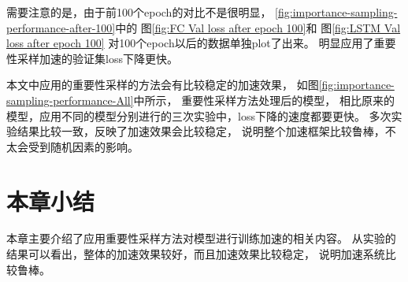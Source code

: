   需要注意的是，由于前100个epoch的对比不是很明显，
  \ref{fig:importance-sampling-performance-after-100}中的
  图\ref{fig:FC Val loss after epoch 100}和
  图\ref{fig:LSTM Val loss after epoch 100}
  对100个epoch以后的数据单独plot了出来。
  明显应用了重要性采样加速的验证集loss下降更快。

  本文中应用的重要性采样的方法会有比较稳定的加速效果，
  如图\ref{fig:importance-sampling-performance-All}中所示，
  重要性采样方法处理后的模型，
  相比原来的模型，应用不同的模型分别进行的三次实验中，loss下降的速度都要更快。
  多次实验结果比较一致，反映了加速效果会比较稳定，
  说明整个加速框架比较鲁棒，不太会受到随机因素的影响。

\section{本章小结}
本章主要介绍了应用重要性采样方法对模型进行训练加速的相关内容。
从实验的结果可以看出，整体的加速效果较好，而且加速效果比较稳定，
说明加速系统比较鲁棒。

